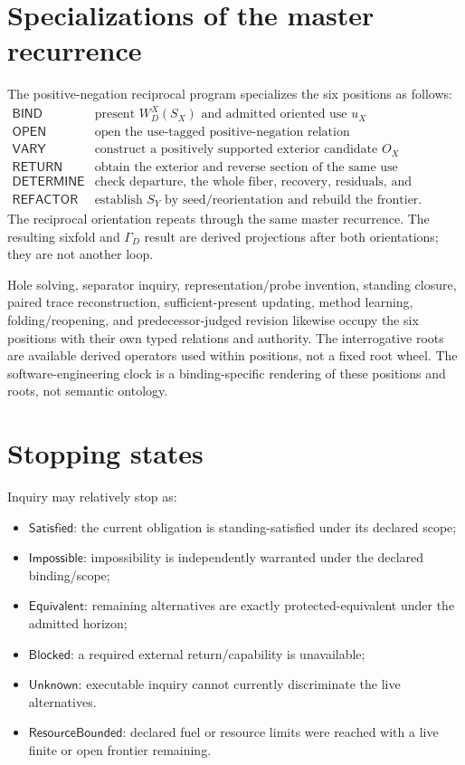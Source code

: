 \documentclass[11pt,oneside]{article}
\begin{document}
\section{Specializations of the master recurrence}

The positive-negation reciprocal program specializes the six positions as follows:
\[
\begin{array}{c|l}
\mathsf{BIND} & \text{present }W_D^X(S_X)\text{ and admitted oriented use }u_X\\
\mathsf{OPEN} & \text{open the use-tagged positive-negation relation}\\
\mathsf{VARY} & \text{construct a positively supported exterior candidate }O_X\\
\mathsf{RETURN} & \text{obtain the exterior and reverse section of the same use}\\
\mathsf{DETERMINE} & \text{check departure, the whole fiber, recovery, residuals, and coverage}\\
\mathsf{REFACTOR} & \text{establish }S_Y\text{ by seed/reorientation and rebuild the frontier.}
\end{array}
\]
The reciprocal orientation repeats through the same master recurrence.  The resulting sixfold and
\(\Gamma_D\) result are derived projections after both orientations; they are not another loop.

Hole solving, separator inquiry, representation/probe invention, standing closure, paired trace
reconstruction, sufficient-present updating, method learning, folding/reopening, and
predecessor-judged revision likewise occupy the six positions with their own typed relations and
authority.  The interrogative roots are available derived operators used within positions, not a
fixed root wheel.  The software-engineering clock is a binding-specific rendering of these
positions and roots, not semantic ontology.

\section{Stopping states}

Inquiry may relatively stop as:
\begin{itemize}
\item \(\mathsf{Satisfied}\): the current obligation is standing-satisfied under its declared scope;
\item \(\mathsf{Impossible}\): impossibility is independently warranted under the declared binding/scope;
\item \(\mathsf{Equivalent}\): remaining alternatives are exactly protected-equivalent under the admitted horizon;
\item \(\mathsf{Blocked}\): a required external return/capability is unavailable;
\item \(\mathsf{Unknown}\): executable inquiry cannot currently discriminate the live alternatives.
\item \(\mathsf{ResourceBounded}\): declared fuel or resource limits were reached with a live finite or open frontier remaining.
\end{itemize}
\end{document}
